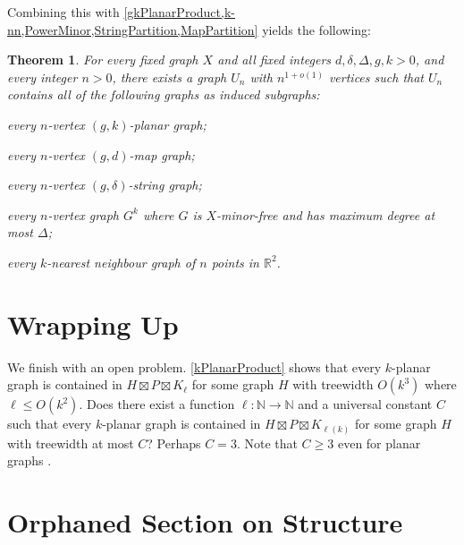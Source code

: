 \documentclass{patmorin}
\theoremstyle{plain}
\newtheorem{thm}{Theorem}
\theoremstyle{definition}
\newcommand{\note}[2]{\noindent{\color{red}[#1:~#2]}}
\renewcommand{\geq}{\geqslant}
\renewcommand{\leq}{\leqslant}
\newcommand{\R}{\mathbb{R}}
\newcommand{\N}{\mathbb{N}}
\begin{document}
Combining this with \cref{gkPlanarProduct,k-nn,PowerMinor,StringPartition,MapPartition} yields the following:

\begin{thm}
	\label{UniversalUniversal}
	For every fixed graph $X$ and all fixed integers $d,\delta,\Delta,g,k>0$, and every integer
	$n>0$, there exists a graph $U_n$ with $n^{1+o(1)}$ vertices such that
	$U_n$ contains all of the following graphs as induced subgraphs:
	\begin{compactitem}
		\item every $n$-vertex $(g,k)$-planar graph;
		\item every $n$-vertex $(g,d)$-map graph;
		\item every $n$-vertex $(g,\delta)$-string graph;
		\item every $n$-vertex graph $G^k$ where $G$ is $X$-minor-free and has maximum degree at most $\Delta$;
		\item every $k$-nearest neighbour graph of $n$ points in $\R^2$.
	\end{compactitem}
\end{thm}


\section{Wrapping Up}
\label{WrappingUp}


We finish with an open problem. \cref{kPlanarProduct} shows that every $k$-planar graph is contained in $H\boxtimes P \boxtimes K_\ell$ for some graph $H$ with treewidth $O(k^3)$ where $\ell\leq O(k^2)$. Does there exist a function $\ell:\N\to\N$ and a universal constant $C$ such that every $k$-planar graph is contained in $H\boxtimes P \boxtimes K_{\ell(k)}$ for some graph $H$ with treewidth at most $C$?  Perhaps $C=3$. Note that $C\geq 3$ even for planar graphs \citep{DJMMUW20}.






\section{Orphaned Section on Structure}

\label{sec-k-planar}


\end{document}

